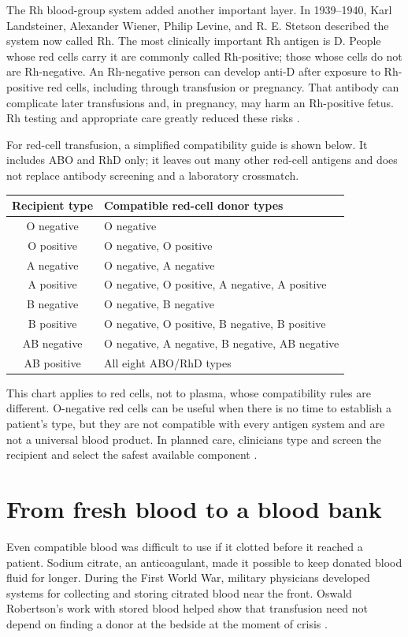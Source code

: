 \documentclass[12pt,oneside]{book}
\begin{document}
The Rh blood-group system added another important layer. In 1939--1940,
Karl Landsteiner, Alexander Wiener, Philip Levine, and R. E. Stetson described
the system now called Rh. The most clinically important Rh antigen is D.
People whose red cells carry it are commonly called Rh-positive; those whose
cells do not are Rh-negative. An Rh-negative person can develop anti-D after
exposure to Rh-positive red cells, including through transfusion or pregnancy.
That antibody can complicate later transfusions and, in pregnancy, may harm an
Rh-positive fetus. Rh testing and appropriate care greatly reduced these
risks \cite{redcrossTransfusionHistory}.

For red-cell transfusion, a simplified compatibility guide is shown below.
It includes ABO and RhD only; it leaves out many other red-cell antigens and
does not replace antibody screening and a laboratory crossmatch.

\begin{center}
\begin{tabular}{c|l}
\textbf{Recipient type} & \textbf{Compatible red-cell donor types} \\
\hline
O negative & O negative \\
O positive & O negative, O positive \\
A negative & O negative, A negative \\
A positive & O negative, O positive, A negative, A positive \\
B negative & O negative, B negative \\
B positive & O negative, O positive, B negative, B positive \\
AB negative & O negative, A negative, B negative, AB negative \\
AB positive & All eight ABO/RhD types \\
\end{tabular}
\end{center}

This chart applies to red cells, not to plasma, whose compatibility rules are
different. O-negative red cells can be useful when there is no time to
establish a patient's type, but they are not compatible with every antigen
system and are not a universal blood product. In planned care, clinicians
type and screen the recipient and select the safest available component
\cite{redcrossTypes}.

\section{From fresh blood to a blood bank}
Even compatible blood was difficult to use if it clotted before it reached a
patient. Sodium citrate, an anticoagulant, made it possible to keep donated
blood fluid for longer. During the First World War, military physicians
developed systems for collecting and storing citrated blood near the front.
Oswald Robertson's work with stored blood helped show that transfusion need
not depend on finding a donor at the bedside at the moment of crisis
\cite{redcrossTransfusionHistory}.
\end{document}
